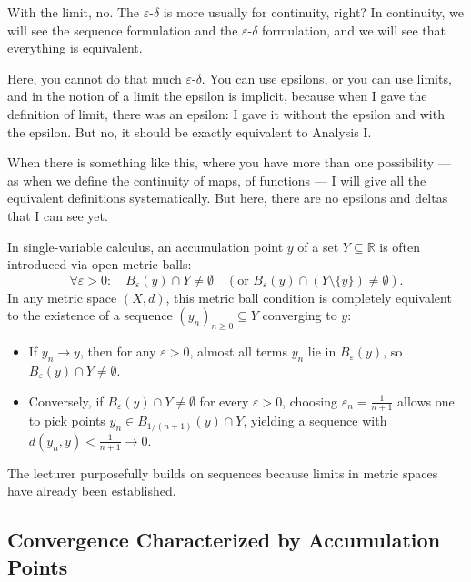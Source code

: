 \begin{speech}[00:28:00 - 00:29:05]
With the limit, no. The $\varepsilon$-$\delta$ is more usually for continuity, right? In continuity, we will see the sequence formulation and the $\varepsilon$-$\delta$ formulation, and we will see that everything is equivalent.

Here, you cannot do that much $\varepsilon$-$\delta$. You can use epsilons, or you can use limits, and in the notion of a limit the epsilon is implicit, because when I gave the definition of limit, there was an epsilon: I gave it without the epsilon and with the epsilon. But no, it should be exactly equivalent to Analysis I.

When there is something like this, where you have more than one possibility --- as when we define the continuity of maps, of functions --- I will give all the equivalent definitions systematically. But here, there are no epsilons and deltas that I can see yet. 
\end{speech}

\begin{insight}
In single-variable calculus, an accumulation point $y$ of a set $Y \subseteq \mathbb{R}$ is often introduced via open metric balls:
\[
\forall \varepsilon > 0 \colon \quad B_\varepsilon(y) \cap Y \neq \emptyset \quad (\text{or } B_\varepsilon(y) \cap (Y \setminus \{y\}) \neq \emptyset).
\]
In any metric space $(X, d)$, this metric ball condition is completely equivalent to the existence of a sequence $(y_n)_{n \ge 0} \subseteq Y$ converging to $y$:
\begin{itemize}
    \item If $y_n \to y$, then for any $\varepsilon > 0$, almost all terms $y_n$ lie in $B_\varepsilon(y)$, so $B_\varepsilon(y) \cap Y \neq \emptyset$.
    \item Conversely, if $B_\varepsilon(y) \cap Y \neq \emptyset$ for every $\varepsilon > 0$, choosing $\varepsilon_n = \frac{1}{n+1}$ allows one to pick points $y_n \in B_{1/(n+1)}(y) \cap Y$, yielding a sequence with $d(y_n, y) < \frac{1}{n+1} \to 0$.
\end{itemize}
The lecturer purposefully builds on sequences because limits in metric spaces have already been established.
\end{insight}

\subsection{Convergence Characterized by Accumulation Points}

